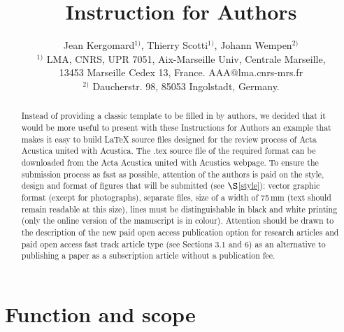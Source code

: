 \documentclass[twocolumn]{article}
\begin{document}
\title{Instruction for Authors}

\author{Jean Kergomard$^{1)}$, Thierry Scotti$^{1)}$, Johann Wempen$^{2)}$ \\
$^{1)}$ LMA, CNRS, UPR 7051, Aix-Marseille Univ, Centrale Marseille,\\
   13453 Marseille Cedex 13, France. AAA@lma.cnrs-mrs.fr\\
$^{2)}$ Daucherstr. 98, 85053 Ingolstadt, Germany.}

\maketitle\thispagestyle{empty}

\begin{abstract}
Instead of providing a classic template to be filled in by authors, we
decided that it would be more useful to present with these Instructions
for Authors an example that makes it easy to build \LaTeX{} source files
designed for the review process of Acta Acustica united with Acustica.
The .tex source file of the required format can be downloaded from the
Acta Acustica united with Acustica webpage. To ensure the submission
process as fast as possible, attention of the authors is paid on the
style, design and format of figures that will be submitted (see
$\S$\ref{style}): vector graphic format (except for photographs),
separate files, size of a width of 75\,mm (text should remain readable
at this size), lines must be distinguishable in black and white printing
(only the online version of the manuscript is in colour). Attention
should be drawn to the description of the new paid open access
publication option for research articles and paid open access fast track
article type (see Sections 3.1 and 6) as an alternative to publishing a
paper as a subscription article without a publication fee.
\end{abstract}

\section{Function and scope}
\end{document}
